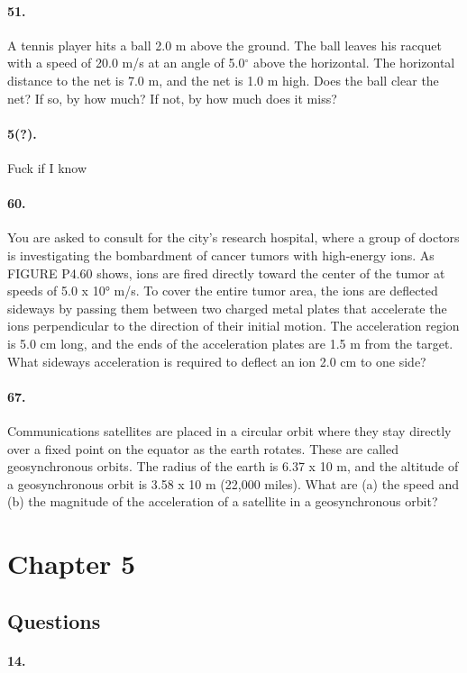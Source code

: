     \paragraph*{51.}
    A tennis player hits a ball 2.0 m above the ground. The ball leaves his racquet with a speed of 20.0 m/s at an angle of 5.0$^\circ$  above the horizontal. The horizontal distance to the net is 7.0 m, and the net is 1.0 m high. Does the ball clear the net? If so, by how much? If not, by how much does it miss?

    \paragraph*{5(?).}
    Fuck if I know

    \paragraph*{60.}
    You are asked to consult for the city's research hospital, where a group of doctors is investigating the bombardment of cancer tumors with high-energy ions. As FIGURE P4.60 shows, ions are fired directly toward the center of the tumor at speeds of 5.0 x 10° m/s. To cover the entire tumor area, the ions are deflected sideways by passing them between two charged metal plates that accelerate the ions perpendicular to the direction of their initial motion. The acceleration region is 5.0 cm long, and the ends of the acceleration plates are 1.5 m from the target. What sideways acceleration is required to deflect an ion 2.0 cm to one side?

    \paragraph*{67.}
    Communications satellites are placed in a circular orbit where they stay directly over a fixed point on the equator as the earth rotates. These are called geosynchronous orbits. The radius of the earth is 6.37 x 10 m, and the altitude of a geosynchronous orbit is 3.58 x 10 m (22,000 miles). What are (a) the speed and (b) the magnitude of the acceleration of a satellite in a geosynchronous orbit?

    \section*{Chapter 5}
    \subsection*{Questions}
    \paragraph*{14.}
    

